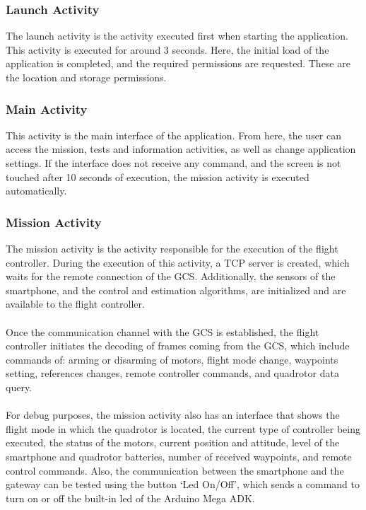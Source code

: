 \subsubsection{Launch Activity}
The launch activity is the activity executed first when starting the application. This activity is executed for around 3 seconds. Here, the initial load of the application is completed, and the required permissions are requested. These are the location and storage permissions.

\subsubsection{Main Activity}
This activity is the main interface of the application. From here, the user can access the mission, tests and information activities, as well as change application settings. If the interface does not receive any command, and the screen is not touched after 10 seconds of execution, the mission activity is executed automatically.

\subsubsection{Mission Activity}
The mission activity is the activity responsible for the execution of the flight controller. During the execution of this activity, a TCP server is created, which waits for the remote connection of the GCS. Additionally, the sensors of the smartphone, and the control and estimation algorithms, are initialized and are available to the flight controller. 
\\\\
Once the communication channel with the GCS is established, the flight controller initiates the decoding of frames coming from the GCS, which include commands of: arming or disarming of motors, flight mode change, waypoints setting, references changes, remote controller commands, and quadrotor data query.
\\\\
For debug purposes, the mission activity also has an interface that shows the flight mode in which the quadrotor is located, the current type of controller being executed, the status of the motors, current position and attitude, level of the smartphone and quadrotor batteries, number of received waypoints, and remote control commands. Also, the communication between the smartphone and the gateway can be tested using the button `Led On/Off', which sends a command to turn on or off the built-in led of the Arduino Mega ADK.


